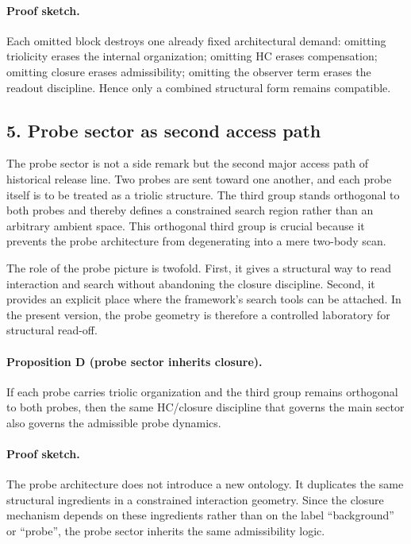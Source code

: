 \documentclass[12pt,a4paper]{article}
\DeclareRobustCommand{\QSCver}[1]{archival stage}
\renewcommand{\QSCver}[1]{historical release line}
\begin{document}
\paragraph{Proof sketch.}
Each omitted block destroys one already fixed architectural demand: omitting
triolicity erases the internal organization; omitting HC erases compensation;
omitting closure erases admissibility; omitting the observer term erases the
readout discipline. Hence only a combined structural form remains compatible.

\subsection*{5. Probe sector as second access path}
The probe sector is not a side remark but the second major access path of
\QSCver{v1.2.0}. Two probes are sent toward one another, and each probe itself is
to be treated as a triolic structure. The third group stands orthogonal to both
probes and thereby defines a constrained search region rather than an arbitrary
ambient space. This orthogonal third group is crucial because it prevents the
probe architecture from degenerating into a mere two-body scan.

The role of the probe picture is twofold. First, it gives a structural way to
read interaction and search without abandoning the closure discipline. Second,
it provides an explicit place where the framework's search tools can be
attached. In the present version, the probe geometry is therefore a controlled
laboratory for structural read-off.

\paragraph{Proposition D (probe sector inherits closure).}
If each probe carries triolic organization and the third group remains
orthogonal to both probes, then the same HC/closure discipline that governs the
main sector also governs the admissible probe dynamics.

\paragraph{Proof sketch.}
The probe architecture does not introduce a new ontology. It duplicates the
same structural ingredients in a constrained interaction geometry. Since the
closure mechanism depends on these ingredients rather than on the label
``background'' or ``probe'', the probe sector inherits the same admissibility
logic.
\end{document}
